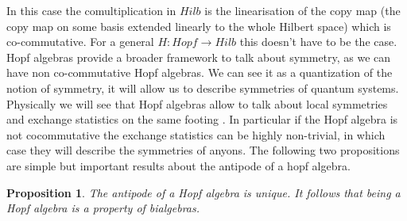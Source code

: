 \documentclass{article}
\newtheorem{proposition}[theorem]{Proposition}
\begin{document}
\begin{center}
\end{center}
In this case the comultiplication in $Hilb$ is the linearisation of the copy map (the copy map on some basis extended linearly to the whole Hilbert space) which is co-commutative. For a general $H:Hopf \rightarrow Hilb$ this doesn't have to be the case. Hopf algebras provide a broader framework to talk about symmetry, as we can have non co-commutative Hopf algebras. We can see it as a quantization of the notion of symmetry, it will allow us to describe symmetries of quantum systems. Physically we will see that Hopf algebras allow to talk about local symmetries and exchange statistics on the same footing \cite{Slingerland02}. In particular if the Hopf algebra is not cocommutative the exchange statistics can be highly non-trivial, in which case they will describe the symmetries of anyons.
The following two propositions are simple but important results about the antipode of a hopf algebra.
\begin{proposition}
	The antipode of a Hopf algebra is unique. It follows that being a Hopf algebra is a property of bialgebras. 
\end{proposition}
\end{document}
